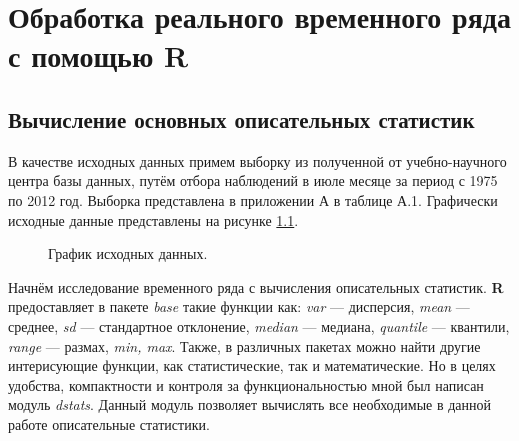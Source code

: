 \newpage

\chapter{Обработка реального временного ряда с помощью R}

\section{Вычисление основных описательных статистик} %
\label{sec:dstats}

В качестве исходных данных примем выборку из полученной от учебно-научного центра базы данных, путём отбора наблюдений в июле месяце за период с 1975 по 2012 год. Выборка представлена в приложении А в таблице А.1. Графически исходные данные представлены на рисунке \ref{img:input}.

\begin{figure}[ht]
\caption{График исходных данных.}
\label{img:input}
\end{figure}

Начнём исследование временного ряда с вычисления описательных статистик. \textbf{R} предоставляет в пакете \textit{base} такие функции как: \textit{var} --- дисперсия, \textit{mean} --- среднее, \textit{sd} --- стандартное отклонение, \textit{median} --- медиана, \textit{quantile} --- квантили, \textit{range} --- размах, \textit{min, max}. Также, в различных пакетах можно найти другие интерисующие функции, как статистические, так и математические. Но в целях удобства, компактности и контроля за функциональностью  мной был написан модуль \textit{dstats}. Данный модуль позволяет вычислять все необходимые в данной работе описательные статистики. 

